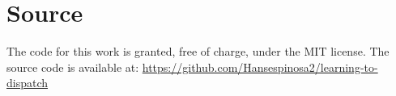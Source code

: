 \documentclass[runningheads]{llncs}
\begin{document}
\section{Source}
The code for this work is granted, free of charge, under the MIT license.
The source code is available at: \href{https://github.com/Hansespinosa2/learning-to-dispatch}{https://github.com/Hansespinosa2/learning-to-dispatch}


        

\end{document}
